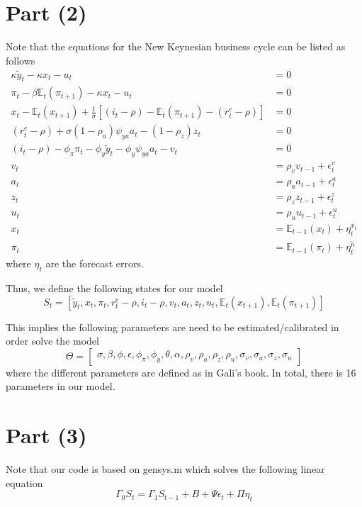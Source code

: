 \documentclass[12pt]{article}
\theoremstyle{definition}
\newcommand\E{\mathbb{E}}
\newcommand{\bra}[1]{\left[#1\right]}
\newcommand{\mat}[1]{\begin{matrix}#1\end{matrix}}
\newcommand{\bmat}[1]{\bra{\mat{#1}}}
\begin{document}
\section*{Part (2)}

Note that the equations for the New Keynesian business cycle can be listed as follows
\begin{align*}
\kappa\tilde{y}_t-\kappa x_t- u_t	& = 0\\
\pi_t-\beta \E_t(\pi_{t+1}) -\kappa {x}_t	-u_t& = 0\\
{x}_t - \E_t( {x}_{t+1}) + \frac{1}{\sigma}[(i_t-\rho)- \E_t(\pi_{t+1})-(r_t^e-\rho)]	& = 0\\
(r_t^e-\rho) +\sigma(1-\rho_a)\psi_{ya}a_t -(1-\rho_z)z_t	& = 0\\
(i_t-\rho) -\phi_{\pi}\pi_t -\phi_y\tilde{y}_t - \phi_y\psi_{ya} a_t-v_t	& = 0\\
v_t& = \rho_v v_{t-1} +\epsilon_t^v \\
a_t& = \rho_a a_{t-1}+\epsilon_t^a \\
z_t& = \rho_z z_{t-1}+\epsilon_t^z \\
u_t& = \rho_u u_{t-1}+\epsilon_t^u \\
{x}_{t}& =\E_{t-1}({x}_{t})+\eta_t^{{x}_t}\\
\pi_{t}& = \E_{t-1}(\pi_{t})+ \eta_t^{\tilde{n}} 
\end{align*}
where $\eta_t$ are the forecast errors.

Thus, we define the following states for our model
\[
S_t = [\tilde{y}_t, x_t,\pi_t,r_t^e-\rho,i_t-\rho,v_t,a_t,z_t,u_t,\E_t(x_{t+1}),\E_t(\pi_{t+1})]
\]

This implies the following parameters are need to be estimated/calibrated in order solve the model
\[
\Theta =\bmat{\sigma, \beta, \phi, \epsilon,\phi_\pi, \phi_y, \theta,\alpha, \rho_v,\rho_a,\rho_z,\rho_u,\sigma_v,\sigma_a,\sigma_z, \sigma_u}
\]
where the different parameters are defined as in Gali's book. In total, there is 16 parameters in our model.


\section*{Part (3)}

Note that our code is based on gensys.m which solves the following linear equation
\[
\Gamma_0 S_t = \Gamma_1 S_{t-1} + B +\Psi \epsilon_t + \Pi \eta_t
\]
\end{document}
